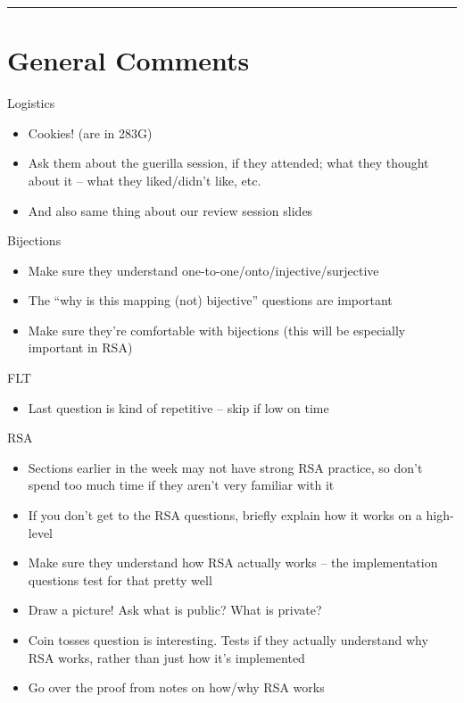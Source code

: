 \documentclass{exam}
\title{}
\date{Bijections, FLT, RSA, Polynomials, Secret Sharing}
\begin{document}
\maketitle
\rule{\textwidth}{0.15em}
\fontsize{12}{15}\selectfont
\thispagestyle{empty}


\section{General Comments}
\begin{questions}
\item Logistics
\begin{itemize}
\item Cookies! (are in 283G)
\item Ask them about the guerilla session, if they attended; what they thought about it – what they liked/didn’t like, etc.
\item And also same thing about our review session slides
\end{itemize}
\item Bijections
\begin{itemize}
\item Make sure they understand one-to-one/onto/injective/surjective
\item The “why is this mapping (not) bijective” questions are important
\item Make sure they’re comfortable with bijections (this will be especially important in RSA)
\end{itemize}
\item FLT
\begin{itemize}
\item Last question is kind of repetitive – skip if low on time
\end{itemize}

\item RSA
\begin{itemize}
\item Sections earlier in the week may not have strong RSA practice, so don’t spend too much time if they aren’t very familiar with it
\item If you don’t get to the RSA questions, briefly explain how it works on a high-level
\item Make sure they understand how RSA actually works – the implementation questions test for that pretty well
\item Draw a picture! Ask what is public? What is private?
\item Coin tosses question is interesting. Tests if they actually understand why RSA works, rather than just how it’s implemented
\item Go over the proof from notes on how/why RSA works
\end{itemize}


\end{questions}
\end{document}
